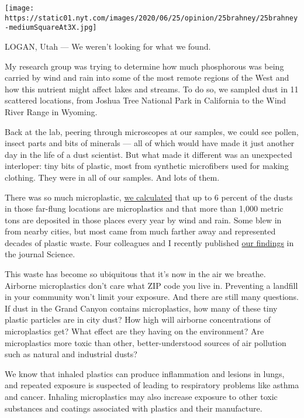 \texttt{[image: https://static01.nyt.com/images/2020/06/25/opinion/25brahney/25brahney-mediumSquareAt3X.jpg]}

LOGAN, Utah --- We weren't looking for what we found.

My research group was trying to determine how much phosphorous was being
carried by wind and rain into some of the most remote regions of the
West and how this nutrient might affect lakes and streams. To do so, we
sampled dust in 11 scattered locations, from Joshua Tree National Park
in California to the Wind River Range in Wyoming.

Back at the lab, peering through microscopes at our samples, we could
see pollen, insect parts and bits of minerals --- all of which would
have made it just another day in the life of a dust scientist. But what
made it different was an unexpected interloper: tiny bits of plastic,
most from synthetic microfibers used for making clothing. They were in
all of our samples. And lots of them.

There was so much microplastic,
\href{https://science.sciencemag.org/content/368/6496/1257}{we
calculated} that up to 6 percent of the dusts in those far-flung
locations are microplastics and that more than 1,000 metric tons are
deposited in those places every year by wind and rain. Some blew in from
nearby cities, but most came from much farther away and represented
decades of plastic waste. Four colleagues and I recently published
\href{https://science.sciencemag.org/content/368/6496/1257}{our
findings} in the journal Science.

This waste has become so ubiquitous that it's now in the air we breathe.
Airborne microplastics don't care what ZIP code you live in. Preventing
a landfill in your community won't limit your exposure. And there are
still many questions. If dust in the Grand Canyon contains
microplastics, how many of these tiny plastic particles are in city
dust? How high will airborne concentrations of microplastics get? What
effect are they having on the environment? Are microplastics more toxic
than other, better-understood sources of air pollution such as natural
and industrial dusts?

We know that inhaled plastics can produce inflammation and lesions in
lungs, and repeated exposure is suspected of leading to respiratory
problems like asthma and cancer. Inhaling microplastics may also
increase exposure to other toxic substances and coatings associated with
plastics and their manufacture.

